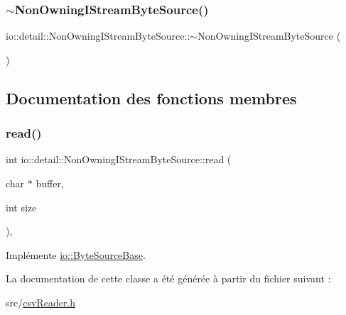 \subsubsection{\texorpdfstring{$\sim$\+Non\+Owning\+I\+Stream\+Byte\+Source()}{~NonOwningIStreamByteSource()}}
{\footnotesize\ttfamily io\+::detail\+::\+Non\+Owning\+I\+Stream\+Byte\+Source\+::$\sim$\+Non\+Owning\+I\+Stream\+Byte\+Source (\begin{DoxyParamCaption}{ }\end{DoxyParamCaption})\hspace{0.3cm}{\ttfamily [inline]}}



\subsection{Documentation des fonctions membres}
\mbox{\label{classio_1_1detail_1_1NonOwningIStreamByteSource_ac7b1968c8314896d7ec0ebb97fdda30d}} 
\subsubsection{\texorpdfstring{read()}{read()}}
{\footnotesize\ttfamily int io\+::detail\+::\+Non\+Owning\+I\+Stream\+Byte\+Source\+::read (\begin{DoxyParamCaption}\item[{char $\ast$}]{buffer,  }\item[{int}]{size }\end{DoxyParamCaption})\hspace{0.3cm}{\ttfamily [inline]}, {\ttfamily [virtual]}}



Implémente \hyperlink{classio_1_1ByteSourceBase_a9598bcc869b79e44da07f0e6fa478615}{io\+::\+Byte\+Source\+Base}.



La documentation de cette classe a été générée à partir du fichier suivant \+:\begin{DoxyCompactItemize}
\item 
src/\hyperlink{csvReader_8h}{csv\+Reader.\+h}\end{DoxyCompactItemize}
